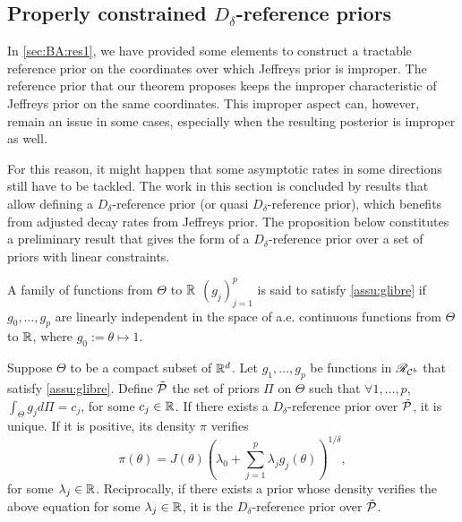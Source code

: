 \subsection{Properly constrained $D_\delta$-reference priors}\label{sec:BA:res2}



In \cref{sec:BA:res1}, we have provided some elements to construct a tractable reference prior on the coordinates over which Jeffreys prior is improper.
The reference prior that our theorem proposes keeps the improper characteristic of Jeffreys prior on the same coordinates.
This improper aspect can, however, remain an issue in some cases, especially when the resulting posterior is improper as well.

For this reason, it might happen that some asymptotic rates in some directions still have to be tackled. The work in this section is concluded by results that allow defining a $D_\delta$-reference prior (or quasi $D_\delta$-reference prior), which benefits from adjusted decay rates from Jeffreys prior. 
The proposition below constitutes a preliminary result that gives the form of a $D_\delta$-reference prior over a set of priors with linear constraints.

\begin{assu}\label{assu:glibre}
    A family of functions from $\Theta$ to $\mathbb{R}$ $(g_j)_{j=1}^p$ is said to satisfy \cref{assu:glibre} if $g_0,\dots,g_p$ are linearly independent in the space of a.e. continuous functions from $\Theta$ to $\mathbb{R}$, where $g_0:=\theta\mapsto 1$.
\end{assu}

\begin{prop}\label{prop:constraints}
    Suppose $\Theta$ to be a compact subset of $\mathbb{R}^d$. Let $g_1,\dots,g_p$ be %
    functions in $\mathscr{R}_{\mathcal{C}^b}$ %
    that satisfy \cref{assu:glibre}. Define $\tilde{\mathcal{P}}$ the set of priors $\varPi$ on $\Theta$ such that $\forall 1,\dots,p$, $\int_\Theta g_jd\varPi=c_j$, for some $c_j\in\mathbb{R}$.
    If %
    there exists a $D_\delta$-reference prior over $\tilde{\mathcal{P}}$, it is unique. If it is positive, its density $\pi$ verifies
    \begin{equation}
        \pi(\theta) = J(\theta)\left(\lambda_0+\sum_{j=1}^p\lambda_jg_j(\theta) \right)^{1/\delta},
    \end{equation}
    for some $\lambda_j\in\mathbb{R}$. Reciprocally, if there exists a prior %
    whose density verifies the above equation for some $\lambda_j\in\mathbb{R}$, it is the $D_\delta$-reference prior over $\tilde{\mathcal{P}}$.
\end{prop}

